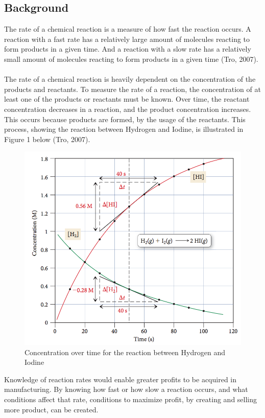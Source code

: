 \documentclass{article}
\begin{document}
\subsection*{Background}%
The rate of a chemical reaction is a measure of how fast the reaction occurs. A reaction with a fast rate has a relatively large amount of molecules reacting to form products in a given time. And a reaction with a slow rate has a relatively small amount of molecules reacting to form products in a given time (Tro, 2007). \\\\
\noindent
The rate of a chemical reaction is heavily dependent on the concentration of the products and reactants. To measure the rate of a reaction, the concentration of at least one of the products or reactants must be known. Over time, the reactant concentration decreases in a reaction, and the product concentration increases. This occurs because products are formed, by the usage of the reactants. This process, showing the reaction between Hydrogen and Iodine, is illustrated in Figure 1 below (Tro, 2007). 
\begin{figure}[H]
	\centering
	\includegraphics{1.png}
	\caption{Concentration over time for the reaction between Hydrogen and Iodine}
\end{figure}
\pagebreak %
\noindent
Knowledge of reaction rates would enable greater profits to be acquired in manufacturing. By knowing how fast or how slow a reaction occurs, and what conditions affect that rate, conditions to maximize profit, by creating and selling more product, can be created. \\\\
\end{document}
